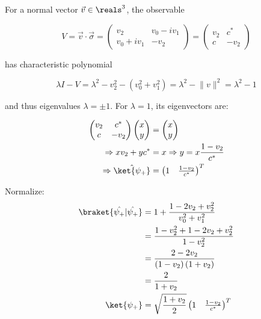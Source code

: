 \par For a normal vector $\vec{v} \in \reals^3$, the observable

$$
V = \vec{v} \cdot \vec{\sigma} = \begin{pmatrix} v_2 & v_0 - i v_1 \\ v_0 + i
v_1 & -v_2 \end{pmatrix} = \begin{pmatrix} v_2 & c^* \\ c & -v_2 \end{pmatrix}
$$

\par has characteristic polynomial

$$
\lambda I - V = \lambda^2 - v_2^2 - \left( v_0^2 + v_1^2 \right) = \lambda^2 -
\lVert v \rVert^2 = \lambda^2 - 1
$$

and thus eigenvalues $\lambda = \pm 1$. For $\lambda = 1$, its eigenvectors are:

\begin{align}
\begin{pmatrix} v_2 & c^* \\ c & -v_2 \end{pmatrix}
\begin{pmatrix} x \\ y \end{pmatrix} &= \begin{pmatrix} x \\ y \end{pmatrix} \\
\Rightarrow x v_2 + y c^* &= x \Rightarrow y = x \frac{1 - v_2}{c^*} \\
\Rightarrow \hat{\ket{\psi_+}} &= \begin{pmatrix} 1 & \frac{1 - v_2}{c^*}
\end{pmatrix}^T
\end{align}

\par Normalize:
\begin{align}
\braket{\hat{\psi_+}|\hat{\psi_+}} &= 1 + \frac{1 - 2 v_2 + v_2^2}{v_0^2 +
v_1^2} \\
&= \frac{1 - v_2^2 + 1 - 2 v_2 + v_2^2}{1 - v_2^2} \\
&= \frac{2 - 2 v_2}{\left( 1 - v_2 \right) \left( 1 + v_2 \right)} \\
&= \frac{2}{1 + v_2} \\
\ket{\psi_+} &= \sqrt{\frac{1 + v_2}{2}} \begin{pmatrix} 1 & \frac{1 - v_2}{c^*}
\end{pmatrix}^T
\end{align}

